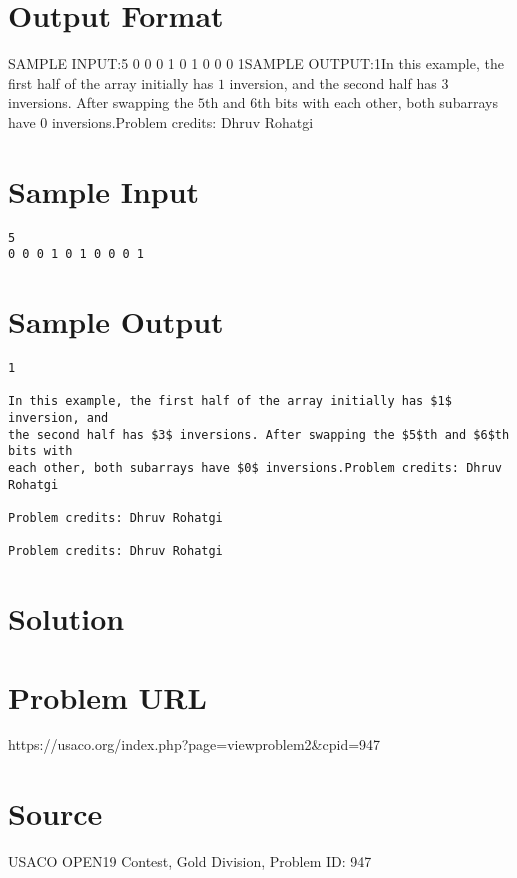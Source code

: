 \documentclass[12pt]{article}
\begin{document}
\section*{Output Format}
SAMPLE INPUT:5
0 0 0 1 0 1 0 0 0 1SAMPLE OUTPUT:1In this example, the first half of the array initially has $1$ inversion, and
the second half has $3$ inversions. After swapping the $5$th and $6$th bits with
each other, both subarrays have $0$ inversions.Problem credits: Dhruv Rohatgi

\section*{Sample Input}
\begin{verbatim}
5
0 0 0 1 0 1 0 0 0 1
\end{verbatim}

\section*{Sample Output}
\begin{verbatim}
1

In this example, the first half of the array initially has $1$ inversion, and
the second half has $3$ inversions. After swapping the $5$th and $6$th bits with
each other, both subarrays have $0$ inversions.Problem credits: Dhruv Rohatgi

Problem credits: Dhruv Rohatgi

Problem credits: Dhruv Rohatgi
\end{verbatim}

\section*{Solution}


\section*{Problem URL}
https://usaco.org/index.php?page=viewproblem2&cpid=947

\section*{Source}
USACO OPEN19 Contest, Gold Division, Problem ID: 947
\end{document}
